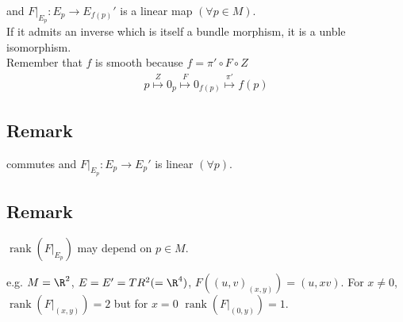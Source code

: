 \documentclass[11pt]{article}
\begin{document}

and \(F|_{E_{p}}:E_{p}\to E_{f(p)}'\) is a linear map \((\forall p\in M)\).\\
If it admits an inverse which is itself a bundle morphism, it is a unble isomorphism.\\
Remember that \(f\) is smooth because \(f=\pi'\circ F\circ Z\)\\
\begin{align*}
  p\overset{Z}{\mapsto}0_{p}\overset{F}{\mapsto}0_{f(p)}\overset{\pi'}{\mapsto}f(p)
\end{align*}
\subsection*{Remark}
\label{sec:org48958f2}


commutes and \(F|_{E_{p}}:E_{p}\to E_{p}'\) is linear \((\forall p)\).\\
\subsection*{Remark}
\label{sec:orgf136fc7}
\(\operatorname{rank}(F|_{E_{p}})\) may depend on \(p\in M\).\\


e.g. \(M=\R^{2}\), \(E=E'=TR^{2}(=\R^{4})\), \(F((u,v)_{(x,y)})=(u,xv)\). For \(x\neq0\), \(\operatorname{rank}(F|_{(x,y)})=2\) but for \(x=0\) \(\operatorname{rank}(F|_{(0,y)})=1\).\\
\end{document}
